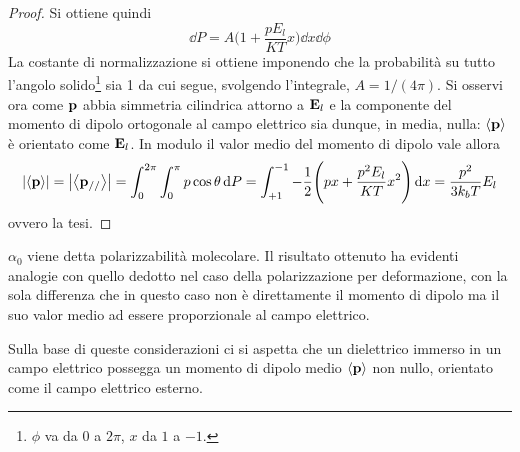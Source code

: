 \begin{description}
\begin{proof}
             Si ottiene quindi
            \[
                \dd{P}=A \Biggl(1+\frac{pE_l}{KT}x\Biggr)\dd{x}\dd{\phi}
            \]
            La costante di normalizzazione si ottiene imponendo che la probabilità su tutto l'angolo
            solido\footnote{$\phi$ va da $0$ a $2\pi$, $x$ da $1$ a $-1$.} sia 1
            da cui segue, svolgendo l'integrale, $A=1/(4\pi)$.
            Si osservi ora come $\vb{p}$ abbia simmetria cilindrica attorno a $\vb{E}_l$ e la componente del momento di dipolo ortogonale
            al campo elettrico sia dunque, in media, nulla: $\expval{\vb{p}}$ è orientato come $\vb{E}_l$.
            In modulo il valor medio del momento di dipolo vale allora
            \[
                \abs{\expval{\vb{p}}}=\abs{\expval{\vb{p}_{//}}}=\int_0^{2\pi}\int_0^{\pi} p \cos{\theta}\dd{P}=
                \int_{+1}^{-1}-\frac{1}{2}\Biggl(px + \frac{p^2E_l }{KT}x^2 \Biggr)\dd{x}=\frac{p^2}{3k_b T}E_l
            \]
            ovvero la tesi.
        \end{proof}
        $\alpha_0$ viene detta polarizzabilità molecolare.
        Il risultato ottenuto ha evidenti analogie con quello dedotto nel caso della polarizzazione per deformazione, con la sola differenza che
        in questo caso non è direttamente il momento di dipolo ma il suo valor medio ad essere proporzionale al campo elettrico.

\end{description}
Sulla base di queste considerazioni ci si aspetta che un dielettrico immerso in un campo elettrico
possegga un momento di dipolo medio $\expval{\vb{p}}$ non nullo, orientato come il campo elettrico
esterno.

